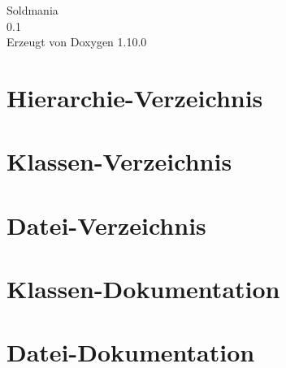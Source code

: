\documentclass[twoside]{book}
\newcommand{\+}{\discretionary{\mbox{\scriptsize$\hookleftarrow$}}{}{}}
\newcommand{\clearemptydoublepage}{%
    \newpage{\pagestyle{empty}\cleardoublepage}%
  }
\begin{document}
  \raggedbottom
    \hypersetup{pageanchor=false,
                bookmarksnumbered=true,
                pdfencoding=unicode
               }
  \begin{titlepage}
  \vspace*{7cm}
  \begin{center}%
  {\Large Soldmania}\\
  [1ex]\large 0.\+1 \\
  \vspace*{1cm}
  {\large Erzeugt von Doxygen 1.10.0}\\
  \end{center}
  \end{titlepage}
  \clearemptydoublepage
  \tableofcontents
  \clearemptydoublepage
  \hypersetup{pageanchor=true}

\chapter{Hierarchie-\/\+Verzeichnis}

\chapter{Klassen-\/\+Verzeichnis}

\chapter{Datei-\/\+Verzeichnis}

\chapter{Klassen-\/\+Dokumentation}













\chapter{Datei-\/\+Dokumentation}





















  \backmatter
  \newpage
  \clearemptydoublepage
  \printindex
\end{document}
